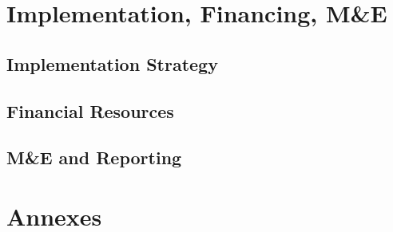 \documentclass[
]{book}
\begin{document}
\hypertarget{implementation-financing-me}{%
\chapter{Implementation, Financing, M\&E}\label{implementation-financing-me}}

\hypertarget{implementation-strategy}{%
\section{Implementation Strategy}\label{implementation-strategy}}

\hypertarget{financial-resources}{%
\section{Financial Resources}\label{financial-resources}}

\hypertarget{me-and-reporting}{%
\section{M\&E and Reporting}\label{me-and-reporting}}

\hypertarget{annexes}{%
\chapter{Annexes}\label{annexes}}

  
\end{document}

